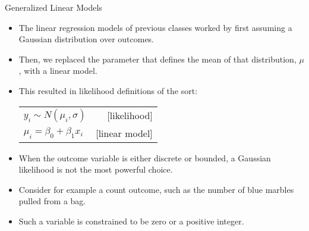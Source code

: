 \documentclass[handout]{beamer}
\begin{document}
\begin{frame}{Generalized Linear Models}
\scriptsize{
\begin{itemize}
\item The linear regression models of previous classes worked by first assuming a Gaussian distribution over outcomes.
\item Then, we replaced the parameter that defines the mean of that distribution, $\mu$, with a linear model.
\item This resulted in likelihood definitions of the sort:

 \vspace{0.3cm}
 \begin{table}
 \centering
 \begin{tabular}{lr}
$y_i \sim N(\mu_i,\sigma)$ & [likelihood] \\
$\mu_i = \beta_0 + \beta_1 x_i$ & [linear model] \\
\end{tabular}
\end{table}
 \vspace{0.3cm}

\item When the outcome variable is either discrete or bounded, a Gaussian likelihood is not the most powerful choice.

\item Consider for example a count outcome, such as the number of blue marbles pulled from a bag.
\item Such a variable is constrained to be zero or a positive integer.

 
\end{itemize}



} 

\end{frame}
\end{document}
